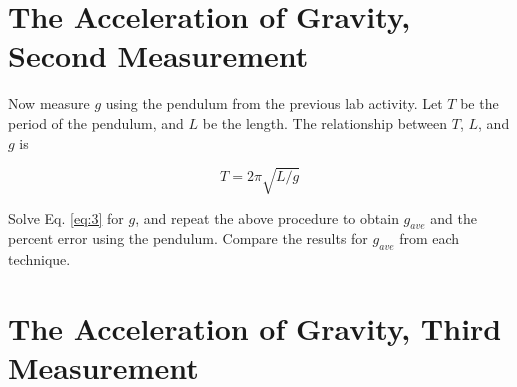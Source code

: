 \documentclass{article}
\begin{document}
\section{The Acceleration of Gravity, \\ Second Measurement}

Now measure $g$ using the pendulum from the previous lab activity.  Let $T$ be the period of the pendulum, and $L$ be the length.  The relationship between $T$, $L$, and $g$ is

\begin{equation}
T = 2\pi \sqrt{L/g} \label{eq:3}
\end{equation}

Solve Eq. \ref{eq:3} for $g$, and repeat the above procedure to obtain $g_{ave}$ and the percent error using the pendulum.  Compare the results for $g_{ave}$ from each technique.

\section{The Acceleration of Gravity, Third Measurement}
\end{document}

